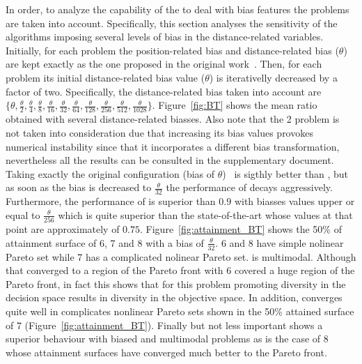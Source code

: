 In order, to analyze the capability of the \MOEAS{} to deal with bias features the \BTS{} problems are taken into account.
%
Specifically, this section analyses the sensitivity of the algorithms imposing several levels of bias in the distance-related variables.
%
Initially, for each problem the position-related bias and distance-related bias ($\theta$) are kept exactly as the one proposed in the original work~\cite{li2016biased}.
%
Then, for each problem its initial distance-related bias value ($\theta$) is iterativelly decreased by a factor of two.
%
Specifically, the distance-related bias taken into account are $\{\theta, \frac{\theta}{2}, \frac{\theta}{4}, \frac{\theta}{8}, \frac{\theta}{16}, \frac{\theta}{32}, \frac{\theta}{64}, \frac{\theta}{128}, \frac{\theta}{256}, \frac{\theta}{512}, \frac{\theta}{1028}\}$.
%
Figure~\ref{fig:BT} shows the mean \HV{} ratio obtained with several distance-related biasses. 
%
Also note that the \BT{}2 problem is not taken into consideration due that increasing its bias values provokes numerical instability since that it incorporates a different bias transformation, nevertheless all the results can be consulted in the supplementary document.
%
Taking exactly the original configuration (bias of $\theta$)~\cite{li2016biased} \AVSDMOEAD{} is sigthly better than \MOEADDE{}, but as soon as the bias is decreased to $\frac{\theta}{32}$ the performance of \MOEADDE{} decays aggressively.
%
Furthermore, the performance of \AVSDMOEAD{} is superior than $0.9$ with biasses values upper or equal to $\frac{\theta}{256}$ which is quite superior than the state-of-the-art \MOEAS{} whose values at that point are approximately of $0.75$.
%
Figure~\ref{fig:attainment_BT} shows the 50\% of attainment surface of \BT{}6, \BT{}7 and \BT{}8 with a bias of $\frac{\theta}{32}$.
%
\BT{}6 and \BT{}8 have simple nolinear Pareto set while \BT{}7 has a complicated nolinear Pareto set.
%
 is multimodal.
%
Although that \MOEADDE{} converged to a region of the Pareto front with \BT{}6 \AVSDMOEAD{} covered a huge region of the Pareto front, in fact this shows that for this problem promoting diversity in the decision space results in diversity in the objective space.
%
In addition, \AVSDMOEAD{} converges quite well in complicates nonlinear Pareto sets shown in the 50\% attained surface of \BT{}7 (Figure~\ref{fig:attainment_BT}).
%
Finally but not less important \AVSDMOEAD{} shows a superior behaviour with biased and multimodal problems as is the case of \BT{}8 whose attainment surfaces have converged much better to the Pareto front.
